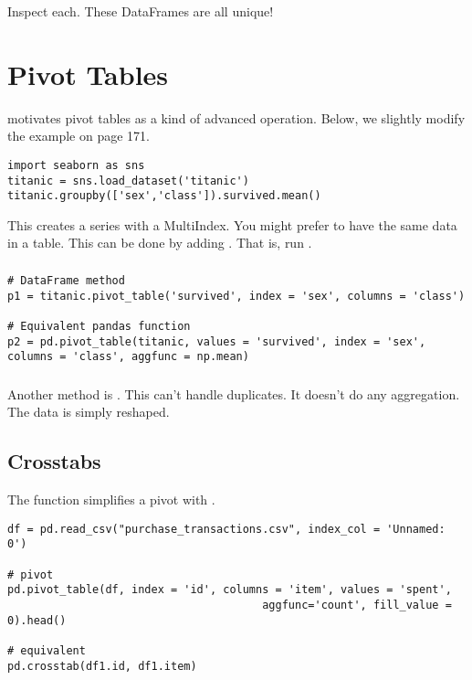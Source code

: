 Inspect each. These DataFrames are all unique!



\section{Pivot Tables}

\cite{vanderplas2016python} motivates pivot tables as a kind of advanced  operation. Below, we slightly modify the example on page 171.

\begin{lstlisting}
import seaborn as sns
titanic = sns.load_dataset('titanic')
titanic.groupby(['sex','class']).survived.mean()
\end{lstlisting}

This creates a series with a MultiIndex. You might prefer to have the same data in a table. This can be done by adding . That is, run . 

\subsubsection{}

\begin{lstlisting}
# DataFrame method
p1 = titanic.pivot_table('survived', index = 'sex', columns = 'class')

# Equivalent pandas function
p2 = pd.pivot_table(titanic, values = 'survived', index = 'sex', columns = 'class', aggfunc = np.mean)
\end{lstlisting}

\subsubsection{}


Another method is . This can't handle duplicates. It doesn't do any aggregation. The data is simply reshaped.

\subsection{Crosstabs}

The  function simplifies a pivot with .


\begin{lstlisting}
df = pd.read_csv("purchase_transactions.csv", index_col = 'Unnamed: 0')

# pivot 
pd.pivot_table(df, index = 'id', columns = 'item', values = 'spent', 
                                       aggfunc='count', fill_value = 0).head()

# equivalent
pd.crosstab(df1.id, df1.item)
\end{lstlisting}

